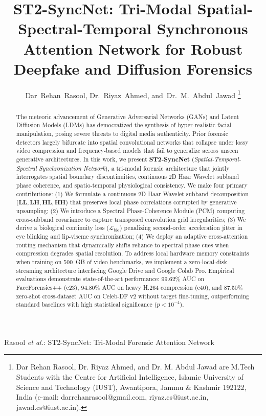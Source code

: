 \documentclass[journal]{IEEEtran}
\begin{document}
\title{ST2-SyncNet: Tri-Modal Spatial-Spectral-Temporal Synchronous Attention Network for Robust Deepfake and Diffusion Forensics}

\author{Dar~Rehan~Rasool,
        Dr.~Riyaz~Ahmed,
        and~Dr.~M.~Abdul~Jawad%
\thanks{Dar Rehan Rasool, Dr. Riyaz Ahmed, and Dr. M. Abdul Jawad are M.Tech Students with the Centre for Artificial Intelligence, Islamic University of Science and Technology (IUST), Awantipora, Jammu \& Kashmir 192122, India (e-mail: darrehanrasool@gmail.com, riyaz.cs@iust.ac.in, jawad.cs@iust.ac.in).}}

%
{Rasool \MakeLowercase{\textit{et al.}}: ST2-SyncNet: Tri-Modal Forensic Attention Network}

\maketitle

\begin{abstract}
The meteoric advancement of Generative Adversarial Networks (GANs) and Latent Diffusion Models (LDMs) has democratized the synthesis of hyper-realistic facial manipulation, posing severe threats to digital media authenticity. Prior forensic detectors largely bifurcate into spatial convolutional networks that collapse under lossy video compression and frequency-based models that fail to generalize across unseen generative architectures. 
In this work, we present \textbf{ST2-SyncNet} (\textit{Spatial-Temporal-Spectral Synchronization Network}), a tri-modal forensic architecture that jointly interrogates spatial boundary discontinuities, continuous 2D Haar Wavelet subband phase coherence, and spatio-temporal physiological consistency. We make four primary contributions: (1) We formulate a continuous 2D Haar Wavelet subband decomposition ($\mathbf{LL}, \mathbf{LH}, \mathbf{HL}, \mathbf{HH}$) that preserves local phase correlations corrupted by generative upsampling; (2) We introduce a Spectral Phase-Coherence Module (PCM) computing cross-subband covariance to capture transposed convolution grid irregularities; (3) We derive a biological continuity loss ($\mathcal{L}_{\text{bio}}$) penalizing second-order acceleration jitter in eye blinking and lip-viseme synchronization; (4) We deploy an adaptive cross-attention routing mechanism that dynamically shifts reliance to spectral phase cues when compression degrades spatial resolution. 
To address local hardware memory constraints when training on 500~GB of video benchmarks, we implement a zero-local-disk streaming architecture interfacing Google Drive and Google Colab Pro. 
Empirical evaluations demonstrate state-of-the-art performance: 99.62\% AUC on FaceForensics++ (c23), 94.80\% AUC on heavy H.264 compression (c40), and 87.50\% zero-shot cross-dataset AUC on Celeb-DF v2 without target fine-tuning, outperforming standard baselines with high statistical significance ($p < 10^{-4}$).
\end{abstract}
\end{document}
